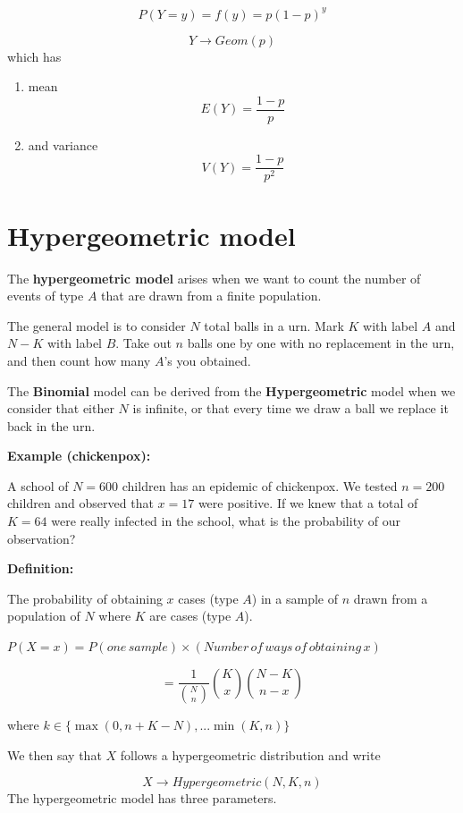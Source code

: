 \documentclass[
]{book}
\begin{document}
\[P(Y=y)=f(y)= p(1-p)^y\]

\[Y\rightarrow Geom(p)\]
which has

\begin{enumerate}
\def\labelenumi{\arabic{enumi})}
\item
  mean \[E(Y)= \frac{1-p}{p}\]
\item
  and variance \[V(Y)= \frac{1-p}{p^2}\]
\end{enumerate}

\hypertarget{hypergeometric-model}{%
\section{Hypergeometric model}\label{hypergeometric-model}}

The \textbf{hypergeometric model} arises when we want to count the number of events of type \(A\) that are drawn from a finite population.

The general model is to consider \(N\) total balls in a urn. Mark \(K\) with label \(A\) and \(N-K\) with label \(B\). Take out \(n\) balls one by one with no replacement in the urn, and then count how many \(A\)'s you obtained.

The \textbf{Binomial} model can be derived from the \textbf{Hypergeometric} model when we consider that either \(N\) is infinite, or that every time we draw a ball we replace it back in the urn.

\textbf{Example (chickenpox):}

A school of \(N=600\) children has an epidemic of chickenpox. We tested \(n=200\) children and observed that \(x=17\) were positive. If we knew that a total of \(K=64\) were really infected in the school, what is the probability of our observation?

\textbf{Definition:}

The probability of obtaining \(x\) cases (type \(A\)) in a sample of \(n\) drawn from a population of \(N\) where \(K\) are cases (type \(A\)).

\(P(X=x)=P(one\,sample) \times (Number\, of\, ways\, of\, obtaining\, x)\)

\[=\frac{1}{\binom N n}\binom K x \binom {N-K} {n-x}\]

where \(k \in \{\max(0, n+K-N), ... \min(K, n) \}\)

We then say that \(X\) follows a hypergeometric distribution and write

\[X \rightarrow Hypergeometric(N,K,n)\]
The hypergeometric model has three parameters.
\end{document}
